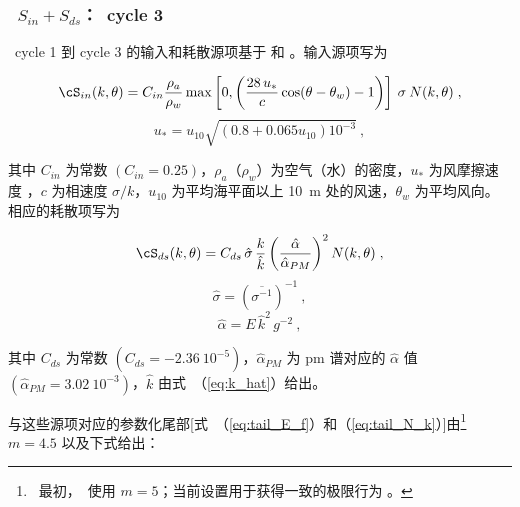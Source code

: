 \vsssub
\subsubsection{~$S_{in} + S_{ds}$：\wam\ cycle 3} \label{sec:ST1}
\vsssub


\noindent
\wam\ cycle 1 到 cycle 3 的输入和耗散源项基于 \cite{art:Sea81} 和 \cite{art:KHH84}\citep[另见][]{art:WAM88}。输入源项写为


\begin{equation}
\cS_{in}(k,\theta) = C_{in} \frac{\rho_a}{\rho_w} \max
\left [ 0 , \left (
\frac{28 \, u_\ast}{c} \cos ( \theta - \theta_w ) - 1
\right ) \right ]
\: \sigma \: N(k,\theta) \; , \label{eq:Snyder}
\end{equation}
\begin{equation}
u_\ast = u_{10} \sqrt{(0.8 + 0.065u_{10})10^{-3}}
\: , \label{eq:Wu}
\end{equation}

\noindent
其中 $C_{in}$ 为常数 $(C_{in} = 0.25)$，$\rho_a$（$\rho_w$）为空气（水）的密度，$u_\ast$ 为风摩擦速度 \citep{art:Cha55,art:Wu82}，$c$ 为相速度 $\sigma/k$，$u_{10}$ 为平均海平面以上 10~m 处的风速，$\theta_w$ 为平均风向。相应的耗散项写为


\begin{equation}
\cS_{ds}(k,\theta) = C_{ds} \, \hat{\sigma} \, \frac{k}{\hat{k}}
\left ( \frac{\hat{\alpha}}{\hat{\alpha}_{PM}} \right ) ^2
N(k,\theta) \; , \label{eq:Snyder_ds}
\end{equation}
\begin{equation}
\hat{\sigma} = \left ( \overline{\sigma^{-1}} \right) ^{-1} \: ,
\label{eq:sigma_hat}
\end{equation}
\begin{equation}
\hat{\alpha} = E \, \hat{k}^2 \,g^{-2} \: ,
\label{eq:alpha_hat}
\end{equation}

\noindent
其中 $C_{ds}$ 为常数 $(C_{ds} = -2.36 \: 10^{-5})$，$\hat{\alpha}_{PM}$ 为 {\sc pm} 谱对应的 $\hat{\alpha}$ 值 $(\hat{\alpha}_{PM} = 3.02\:10^{-3})$，$\hat{k}$ 由式~（\ref{eq:k_hat}）给出。

与这些源项对应的参数化尾部[式~（\ref{eq:tail_E_f}）和（\ref{eq:tail_N_k}）]由\footnote{~最初，\wam\ 使用 $m = 5$；当前设置用于获得一致的极限行为 \cite[例如][]{tol:JPO92}。} $m = 4.5$ 以及下式给出：

